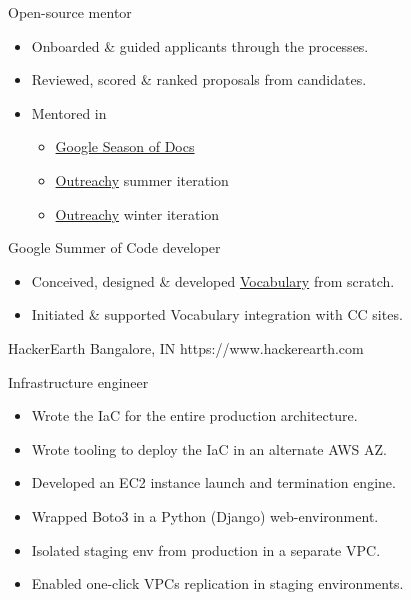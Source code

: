 \rolesubsubsection
  {Open-source mentor}
  {}

\begin{sectiondescription}
  \begin{itemize}[nosep, leftmargin = *]
    \item Onboarded \& guided applicants through the processes.
    \item Reviewed, scored \& ranked proposals from candidates.
    \item Mentored in
    \begin{itemize}[nosep, leftmargin = *, label = {-}]
      \item \href{https://developers.google.com/season-of-docs}{Google Season of Docs} \hfill \textcolor{secondary}{}
      \item \href{https://outreachy.org/}{Outreachy} summer iteration \hfill \textcolor{secondary}{}
      \item \href{https://outreachy.org/}{Outreachy} winter iteration \hfill \textcolor{secondary}{}
    \end{itemize}
  \end{itemize}
\end{sectiondescription}

\rolesubsubsection
  {Google Summer of Code developer}
  {}

\begin{sectiondescription}
  \begin{itemize}[nosep, leftmargin = *]
    \item Conceived, designed \& developed \href{https://opensource.creativecommons.org/vocabulary/}{Vocabulary} from scratch.
    \item Initiated \& supported Vocabulary integration with CC sites.
  \end{itemize}
\end{sectiondescription}


\organisationsubsection
  {HackerEarth}
  {Bangalore, IN}
  {https://www.hackerearth.com}

\rolesubsubsection
  {Infrastructure engineer}
  {}

\begin{sectiondescription}
  \begin{itemize}[nosep, leftmargin = *]
    \item Wrote the IaC for the entire production architecture.
    \item Wrote tooling to deploy the IaC in an alternate AWS AZ.
    \item Developed an EC2 instance launch and termination engine.
    \item Wrapped Boto3 in a Python (Django) web-environment.
    \item Isolated staging env from production in a separate VPC.
    \item Enabled one-click VPCs replication in staging environments.
  \end{itemize}
\end{sectiondescription}

